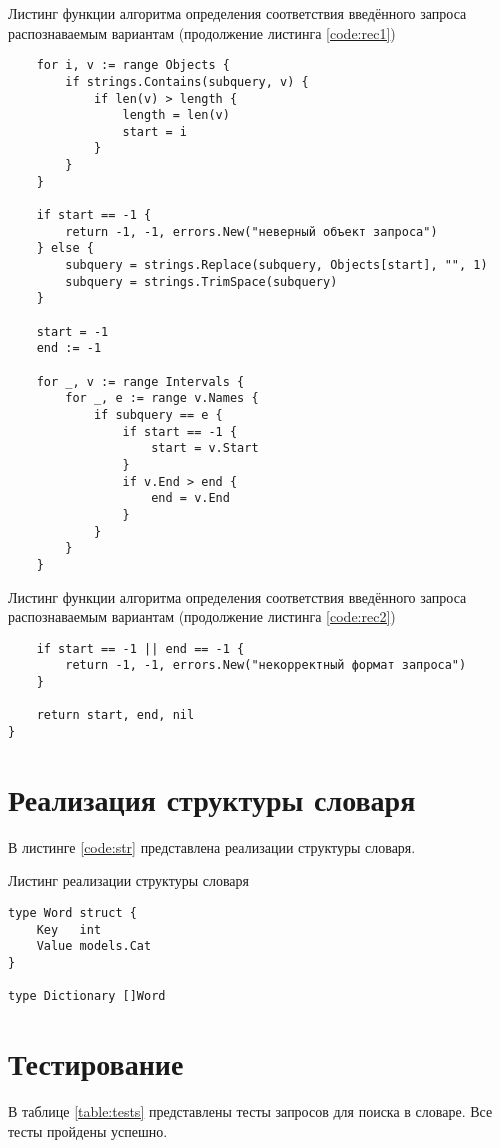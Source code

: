 \begin{code}
\caption{Листинг функции алгоритма определения соответствия введённого запроса распознаваемым вариантам (продолжение листинга \ref{code:rec1})}
\label{code:rec2}
\begin{verbatim}
	for i, v := range Objects {
		if strings.Contains(subquery, v) {
			if len(v) > length {
				length = len(v)
				start = i
			}
		}
	}

	if start == -1 {
		return -1, -1, errors.New("неверный объект запроса")
	} else {
		subquery = strings.Replace(subquery, Objects[start], "", 1)
		subquery = strings.TrimSpace(subquery)
	}
	
	start = -1
	end := -1
	
	for _, v := range Intervals {
		for _, e := range v.Names {
			if subquery == e {
				if start == -1 {
					start = v.Start
				}
				if v.End > end {
					end = v.End
				}
			}
		}
	}
\end{verbatim}
\end{code}

\newpage

\begin{code}
\caption{Листинг функции алгоритма определения соответствия введённого запроса распознаваемым вариантам (продолжение листинга \ref{code:rec2})}
\label{code:rec3}
\begin{verbatim}
	if start == -1 || end == -1 {
		return -1, -1, errors.New("некорректный формат запроса")
	}

	return start, end, nil
}
\end{verbatim}
\end{code}

\section{Реализация структуры словаря}
В листинге \ref{code:str} представлена реализации структуры словаря.

\begin{code}
\caption{Листинг реализации структуры словаря}
\label{code:str}
\begin{verbatim}
type Word struct {
	Key   int
	Value models.Cat
}

type Dictionary []Word
\end{verbatim}
\end{code}

\newpage

\section{Тестирование}
В таблице \ref{table:tests} представлены тесты запросов для поиска в словаре. Все тесты пройдены успешно.

